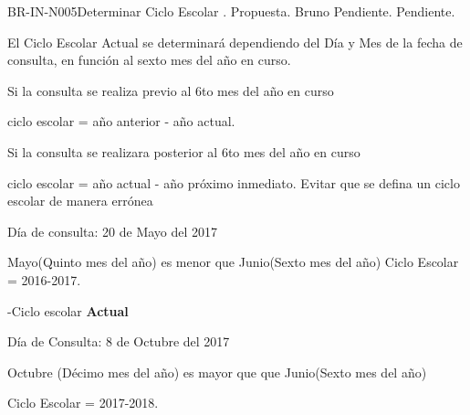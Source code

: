 \begin{BusinessRule}{BR-IN-N005}{Determinar Ciclo Escolar}
	{\bcDerivation}    %
	{\btTimer}     %
	{\blControlling}    %
	.
	\BRItem[Estado] Propuesta.
	 Bruno
	 Pendiente.
	 Pendiente.
	\BRItem[Descripción] 
	
El Ciclo Escolar Actual se determinará dependiendo del Día y Mes de la fecha de consulta, en función al sexto mes del año en curso. 



		\BRItem[Sentencia]  Si la consulta se realiza previo al 6to mes del año en curso 
		
		ciclo escolar = año anterior - año actual.
		
		Si la consulta se realizara posterior al 6to mes del año en curso 
		
		ciclo escolar = año actual - año próximo inmediato.
		\BRItem[Motivación] Evitar que se defina un ciclo escolar de manera errónea 
		\BRItem[Ejemplos ] \cdtEmpty
	
	Día de consulta: 20 de Mayo del 2017
	
	Mayo(Quinto mes del año) es menor que Junio(Sexto mes del año)
	Ciclo Escolar = 2016-2017.
	
	-Ciclo escolar \textbf{Actual}
	
	Día de Consulta: 8 de Octubre del 2017
	
	Octubre (Décimo mes del año) es mayor que que Junio(Sexto mes del año)
	
	Ciclo Escolar = 2017-2018.

\end{BusinessRule}

